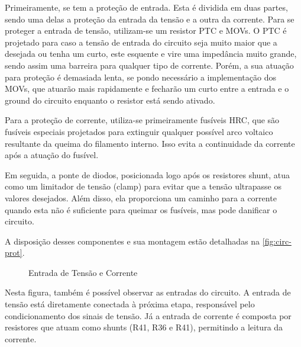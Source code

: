 Primeiramente, se tem a proteção de entrada. Esta é dividida em duas partes, sendo uma delas a proteção da entrada da tensão e a outra da corrente. Para se proteger a entrada de tensão, utilizam-se um resistor \gls{PTC} e \gls{MOV}s. O \gls{PTC} é projetado para caso a tensão de entrada do circuito seja muito maior que a desejada ou tenha um curto, este esquente e vire uma impedância muito grande, sendo assim uma barreira para qualquer tipo de corrente. Porém, a sua atuação para proteção é demasiada lenta, se pondo necessário a implementação dos \gls{MOV}s, que atuarão mais rapidamente e fecharão um curto entre a entrada e o ground do circuito enquanto o resistor está sendo ativado.

Para a proteção de corrente, utiliza-se primeiramente fusíveis \gls{HRC}, que são fusíveis especiais projetados para extinguir qualquer possível arco voltaico resultante da queima do filamento interno. Isso evita a continuidade da corrente após a atuação do fusível.

Em seguida, a ponte de diodos, posicionada logo após os resistores shunt, atua como um limitador de tensão (clamp) para evitar que a tensão ultrapasse os valores desejados. Além disso, ela proporciona um caminho para a corrente quando esta não é suficiente para queimar os fusíveis, mas pode danificar o circuito.

A disposição desses componentes e sua montagem estão detalhadas na \autoref{fig:circ-prot}.

\begin{figure}[htb!]
    \caption{Entrada de Tensão e Corrente}
    \label{fig:circ-prot}
    \fonte{}
\end{figure}

Nesta figura, também é possível observar as entradas do circuito. A entrada de tensão está diretamente conectada à próxima etapa, responsável pelo condicionamento dos sinais de tensão. Já a entrada de corrente é composta por resistores que atuam como shunts (R41, R36 e R41), permitindo a leitura da corrente.

